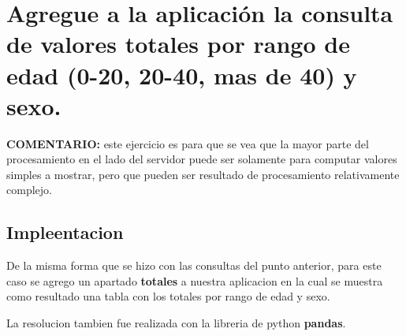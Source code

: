 \documentclass[12pt]{extarticle}
\begin{document}
    \section{Agregue a la aplicación la consulta de valores totales por
rango de edad (0-20, 20-40, mas de 40) y
sexo.}\label{agregue-a-la-aplicaciuxf3n-la-consulta-de-valores-totales-por-rango-de-edad-0-20-20-40-mas-de-40-y-sexo.}

\textbf{COMENTARIO:} este ejercicio es para que se vea que la mayor
parte del procesamiento en el lado del servidor puede ser solamente para
computar valores simples a mostrar, pero que pueden ser resultado de
procesamiento relativamente complejo.

    \subsection{Impleentacion}\label{impleentacion}

De la misma forma que se hizo con las consultas del punto anterior, para
este caso se agrego un apartado \textbf{totales} a nuestra aplicacion en
la cual se muestra como resultado una tabla con los totales por rango de
edad y sexo.

La resolucion tambien fue realizada con la libreria de python
\textbf{pandas}.
\end{document}
